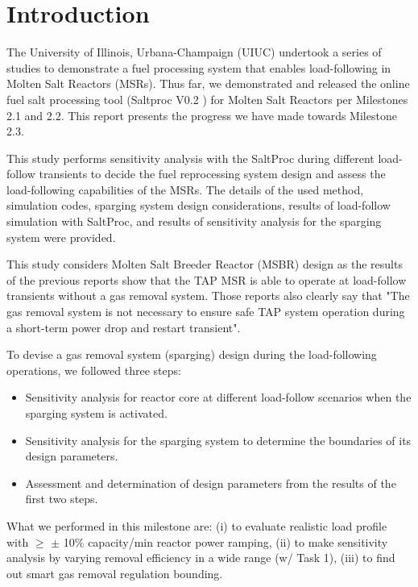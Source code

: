 \section{Introduction}

    The University of Illinois, Urbana-Champaign (UIUC) undertook a series of studies to demonstrate a fuel processing system that enables load-following in Molten Salt Reactors (MSRs). Thus far, we demonstrated and released the online fuel salt processing tool (Saltproc V0.2 \cite{rykhlevskii_saltproc_2018}) for Molten Salt Reactors per Milestones 2.1 and 2.2. This report presents the progress we have made towards Milestone 2.3.

    This study performs sensitivity analysis with the SaltProc during different load-follow transients to decide the fuel reprocessing system design and assess the load-following capabilities of the MSRs. The details of the used method, simulation codes, sparging system design considerations, results of load-follow simulation with SaltProc, and results of sensitivity analysis for the sparging system were provided.

    This study considers Molten Salt Breeder Reactor (MSBR) \cite{robertson_conceptual_1971} design as the results of the previous reports \cite{rykhlevskii_milestone_2019} show that the TAP MSR is able to operate at load-follow transients without a gas removal system. Those reports also clearly say that "The gas removal system is not necessary to ensure safe TAP system operation during a short-term power drop and restart transient".

    To devise a gas removal system (sparging) design during the load-following operations, we followed three steps:
    \begin{itemize}
        \item Sensitivity analysis for reactor core at different load-follow scenarios when the sparging system is activated.
        \item Sensitivity analysis for the sparging system to determine the boundaries of its design parameters.
        \item Assessment and determination of design parameters from the results of the first two steps.
    \end{itemize}

    What we performed in this milestone are: (i) to evaluate realistic load profile with $\geq$ $\pm$ 10\% capacity/min reactor power ramping, (ii) to make sensitivity analysis by varying removal efficiency in a wide range (w/ Task 1), (iii) to find out smart gas removal regulation bounding.

